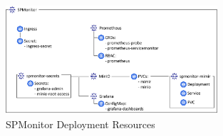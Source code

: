 \begin{figure}[tb]
  \centering
  \includegraphics[width=0.7\textwidth]{figures/6.7_spmonitor_resources.png}
  \caption{SPMonitor Deployment Resources}
  \label{fig:spmonitor_resources}
\end{figure}
